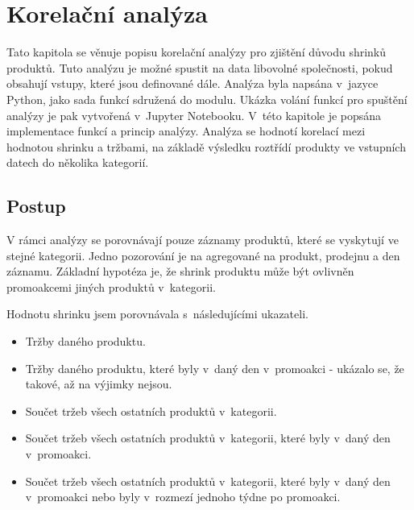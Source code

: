 \chapter{Korelační analýza}

Tato kapitola se věnuje popisu korelační analýzy pro zjištění důvodu shrinků produktů. Tuto analýzu je možné spustit na data libovolné společnosti, pokud obsahují vstupy, které jsou definované dále. Analýza byla napsána v~jazyce Python, jako sada funkcí sdružená do modulu. Ukázka volání funkcí pro spuštění analýzy je pak vytvořená v~Jupyter Notebooku. V~této kapitole je popsána implementace funkcí a princip analýzy. Analýza se hodnotí korelací mezi hodnotou shrinku a tržbami, na základě výsledku roztřídí produkty ve vstupních datech do několika kategorií. 




\section{Postup}
\label{sec:korpostup}
V rámci analýzy se porovnávají pouze záznamy produktů, které se vyskytují ve stejné kategorii. Jedno pozorování je na agregované na produkt, prodejnu a den záznamu. Základní hypotéza je, že shrink produktu může být ovlivněn promoakcemi jiných produktů v~kategorii.

Hodnotu shrinku jsem porovnávala s~následujícími ukazateli. 
\begin{itemize}
    \itemsep0em 
    \item Tržby daného produktu.
    \item Tržby daného produktu, které byly v~daný den v~promoakci - ukázalo se, že takové, až na výjimky nejsou.
    \item Součet tržeb všech ostatních produktů v~kategorii.
    \item Součet tržeb všech ostatních produktů v~kategorii, které byly v~daný den v~promoakci.
    \item Součet tržeb všech ostatních produktů v~kategorii, které byly v~daný den v~promoakci nebo byly v~rozmezí jednoho týdne po promoakci.
\end{itemize}

